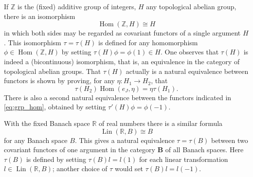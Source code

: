 \documentclass[11pt,a4paper]{report}
\newcommand{\R}{\mathbb{R}}
\DeclareMathOperator{\hm}{Hom}
\DeclareMathOperator{\lin}{Lin}
\begin{document}
If $\mathbb{Z}$ is the (fixed) additive group of integers, $H$ any topological abelian group, there is an
isomorphism
\begin{equation}\label{eq:grp_hom}
	\hm(\mathbb{Z},H)\cong H
\end{equation}
in which both sides may be regarded as covariant functors of a single argument $H$. This isomorphism
$\tau=\tau(H)$ is defined for any homomorphism $\phi\in\hm(\mathbb{Z},H)$ by setting $\tau(H)\phi=\phi(1)\in H$.
One observes that $\tau(H)$ is indeed a (bicontinuous) isomorphism, that is, an equivalence in the category
of topological abelian groups. That $\tau(H)$ actually is a natural equivalence between functors is shown by 
proving, for any $\eta:H_1\rightarrow H_2$, that
\begin{equation*}
	\tau(H_2)\hm(e_J,\eta)=\eta\tau(H_1).
\end{equation*}
There is also a second natural equivalence between the functors indicated in \cref{eq:grp_hom}, obtained by
setting $\tau'(H)\phi=\phi(-1)$.

With the fixed Banach space $\R$ of real numbers there is a similar formula
\begin{equation}\label{eq:ban_hom}
	\lin(\R,B)\cong B
\end{equation}
for any Banach space $B$. This gives a natural equivalence $\tau=\tau(B)$ between two covariant functors of
one argument in the category $\mathbf{B}$ of all Banach spaces. Here $\tau(B)$ is defined by setting
$\tau(B)l= l(1)$ for each linear transformation $l\in\lin(\R,B)$; another choice of $\tau$ would set
$\tau(B)l= l(-1)$.
\end{document}
